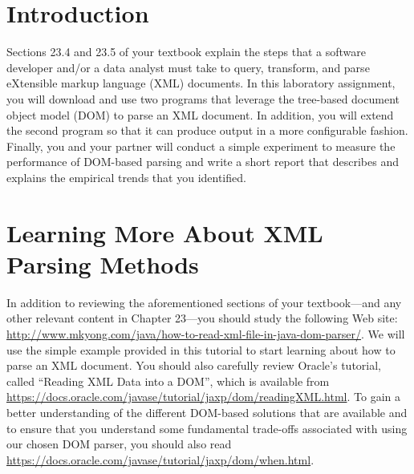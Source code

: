 


\usepackage[compact]{titlesec}



\section*{Introduction}

Sections 23.4 and 23.5 of your textbook explain the steps that a software developer and/or a data analyst must take to
query, transform, and parse eXtensible markup language (XML) documents. In this laboratory assignment, you will download
and use two programs that leverage the tree-based document object model (DOM) to parse an XML document.  In addition,
you will extend the second program so that it can produce output in a more configurable fashion.  Finally, you and your
partner will conduct a simple experiment to measure the performance of DOM-based parsing and write a short report that
describes and explains the empirical trends that you identified.

\vspace*{-.05in}
\section*{Learning More About XML Parsing Methods}

In addition to reviewing the aforementioned sections of your textbook---and any other relevant content in Chapter
23---you should study the following Web site: \url{http://www.mkyong.com/java/how-to-read-xml-file-in-java-dom-parser/}.
We will use the simple example provided in this tutorial to start learning about how to parse an XML document.  You
should also carefully review Oracle's tutorial, called ``Reading XML Data into a DOM'', which is available from
\url{https://docs.oracle.com/javase/tutorial/jaxp/dom/readingXML.html}. To gain a better understanding of the different
DOM-based solutions that are available and to ensure that you understand some fundamental trade-offs associated with
using our chosen DOM parser, you should also read \url{https://docs.oracle.com/javase/tutorial/jaxp/dom/when.html}.

\vspace*{-.05in}
